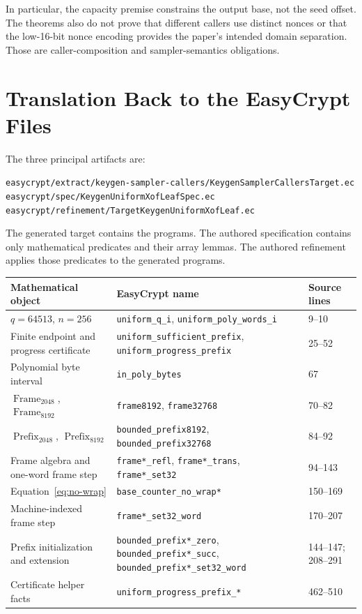 \documentclass[11pt]{article}
\theoremstyle{definition}
\theoremstyle{plain}
\theoremstyle{remark}
\newcommand{\code}[1]{\nolinkurl{#1}}
\newcommand{\Frame}{\operatorname{Frame}}
\newcommand{\Prefix}{\operatorname{Prefix}}
\begin{document}
In particular, the capacity premise constrains the output base, not the seed
offset.  The theorems also do not prove that different callers use distinct
nonces or that the low-16-bit nonce encoding provides the paper's intended
domain separation.  Those are caller-composition and sampler-semantics
obligations.

\section{Translation Back to the EasyCrypt Files}

The three principal artifacts are:
\begin{center}
\footnotesize
\code{easycrypt/extract/keygen-sampler-callers/KeygenSamplerCallersTarget.ec}\\
\code{easycrypt/spec/KeygenUniformXofLeafSpec.ec}\\
\code{easycrypt/refinement/TargetKeygenUniformXofLeaf.ec}
\end{center}

The generated target contains the programs.  The authored specification
contains only mathematical predicates and their array lemmas.  The authored
refinement applies those predicates to the generated programs.

\begin{center}
\small
\begin{tabularx}{0.98\textwidth}{>{\raggedright\arraybackslash}p{}
                                  >{\raggedright\arraybackslash}p{}X}
\toprule
Mathematical object & EasyCrypt name & Source lines \\
\midrule
$q=64513$, $n=256$ & \code{uniform_q_i}, \code{uniform_poly_words_i} & 9--10 \\
Finite endpoint and progress certificate & \code{uniform_sufficient_prefix}, \code{uniform_progress_prefix} & 25--52 \\
Polynomial byte interval & \code{in_poly_bytes} & 67 \\
$\Frame_{2048}$, $\Frame_{8192}$ & \code{frame8192}, \code{frame32768} & 70--82 \\
$\Prefix_{2048}$, $\Prefix_{8192}$ & \code{bounded_prefix8192}, \code{bounded_prefix32768} & 84--92 \\
Frame algebra and one-word frame step & \code{frame*_refl}, \code{frame*_trans}, \code{frame*_set32} & 94--143 \\
Equation~\eqref{eq:no-wrap} & \code{base_counter_no_wrap*} & 150--169 \\
Machine-indexed frame step & \code{frame*_set32_word} & 170--207 \\
Prefix initialization and extension & \code{bounded_prefix*_zero}, \code{bounded_prefix*_succ}, \code{bounded_prefix*_set32_word} & 144--147; 208--291 \\
Certificate helper facts & \code{uniform_progress_prefix_*} & 462--510 \\
\bottomrule
\end{tabularx}
\end{center}
\end{document}
